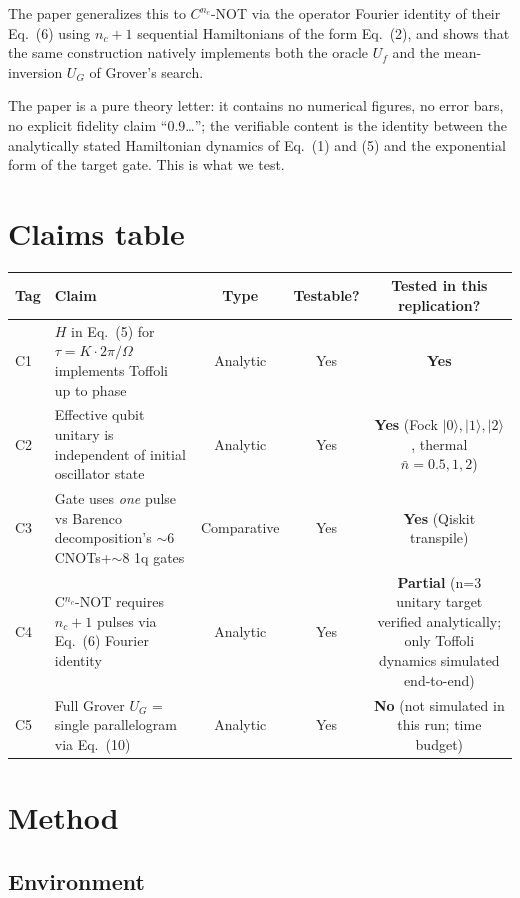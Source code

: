 \documentclass[11pt]{article}
\begin{document}
The paper generalizes this to $C^{n_c}$-NOT via the operator Fourier identity of
their Eq.~(6) using $n_c+1$ sequential Hamiltonians of the form Eq.~(2), and shows
that the same construction natively implements both the oracle $U_f$ and the
mean-inversion $U_G$ of Grover's search.

The paper is a pure theory letter: it contains no numerical figures, no error
bars, no explicit fidelity claim ``0.9\ldots''; the verifiable content is the
identity between the analytically stated Hamiltonian dynamics of Eq.~(1) and (5)
and the exponential form of the target gate. This is what we test.

\section{Claims table}

\begin{center}
\begin{tabular}{@{}llccc@{}}
\toprule
Tag & Claim & Type & Testable? & Tested in this replication? \\
\midrule
C1 & $H$ in Eq.~(5) for $\tau = K\cdot 2\pi/\Omega$ implements Toffoli up to phase & Analytic & Yes & \textbf{Yes} \\
C2 & Effective qubit unitary is independent of initial oscillator state & Analytic & Yes & \textbf{Yes} (Fock $|0\rangle,|1\rangle,|2\rangle$, thermal $\bar n=0.5,1,2$) \\
C3 & Gate uses \emph{one} pulse vs Barenco decomposition's $\sim 6$ CNOTs+$\sim 8$ 1q gates & Comparative & Yes & \textbf{Yes} (Qiskit transpile) \\
C4 & C$^{n_c}$-NOT requires $n_c+1$ pulses via Eq.~(6) Fourier identity & Analytic & Yes & \textbf{Partial} (n=3 unitary target verified analytically; only Toffoli dynamics simulated end-to-end) \\
C5 & Full Grover $U_G$ = single parallelogram via Eq.~(10) & Analytic & Yes & \textbf{No} (not simulated in this run; time budget) \\
\bottomrule
\end{tabular}
\end{center}

\section{Method}

\subsection*{Environment}
\end{document}
